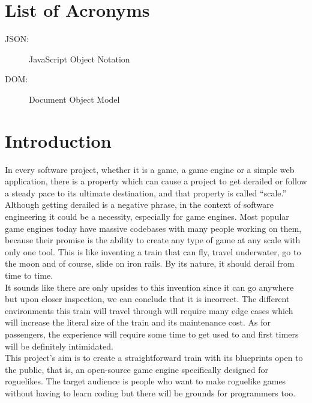 \documentclass{article}
\begin{document}


\tableofcontents
\section*{List of Acronyms}
\begin{description}
  \item[JSON:] JavaScript Object Notation
  \item[DOM:] Document Object Model
\end{description}

\clearpage %

\section{Introduction}
In every software project, whether it is a game, a game engine or a simple web application, there is a property which can cause a project to get derailed or follow a steady pace to its ultimate destination, and that property is called “scale.”\\ 

Although getting derailed is a negative phrase, in the context of software engineering it could be a necessity, especially for game engines. Most popular game engines today have massive codebases with many people working on them, because their promise is the ability to create any type of game at any scale with only one tool. This is like inventing a train that can fly, travel underwater, go to the moon and of course, slide on iron rails. By its nature, it should derail from time to time.\\

It sounds like there are only upsides to this invention since it can go anywhere but upon closer inspection, we can conclude that it is incorrect. The different environments this train will travel through will require many edge cases which will increase the literal size of the train and its maintenance cost. As for passengers, the experience will require some time to get used to and first timers will be definitely intimidated.\\ 

This project’s aim is to create a straightforward train with its blueprints open to the public, that is, an open-source game engine specifically designed for roguelikes. The target audience is people who want to make roguelike games without having to learn coding but there will be grounds for programmers too.\\ 
\end{document}
